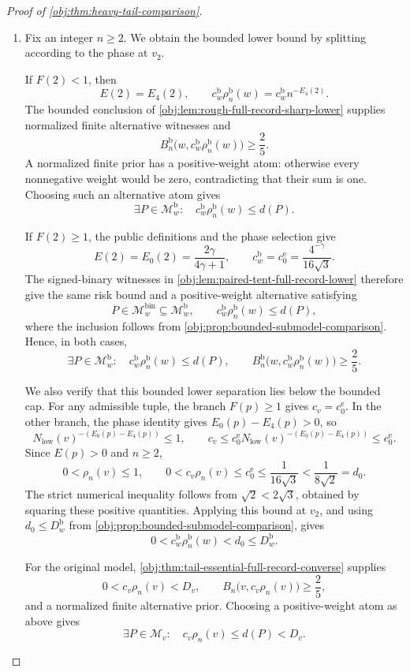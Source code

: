\begin{proof}[Proof of \cref{obj:thm:heavy-tail-comparison}]
\begin{enumerate}
\item Fix an integer \(n\ge2\). We obtain the bounded lower bound by splitting according to the phase at \(v_2\).

If \(F(2)<1\), then
\[
E(2)=E_4(2),
\qquad
c_w^{\mathrm b}\rho_n^{\mathrm b}(w)
=c_w^{\mathrm b}n^{-E_4(2)}.
\]
The bounded conclusion of \cref{obj:lem:rough-full-record-sharp-lower} supplies normalized finite alternative witnesses and
\[
B_n^{\mathrm b}
 \bigl(w,c_w^{\mathrm b}\rho_n^{\mathrm b}(w)\bigr)
\ge\frac25.
\]
A normalized finite prior has a positive-weight atom: otherwise every nonnegative weight would be zero, contradicting that their sum is one. Choosing such an alternative atom gives
\[
\exists P\in\mathcal M_w^{\mathrm b}:
\quad
c_w^{\mathrm b}\rho_n^{\mathrm b}(w)\le d(P).
\]

If \(F(2)\ge1\), the public definitions and the phase selection give
\[
E(2)=E_0(2)=\frac{2\gamma}{4\gamma+1},
\qquad
c_w^{\mathrm b}=c_0^{\mathrm e}
=\frac{4^{-\gamma}}{16\sqrt3}.
\]
The signed-binary witnesses in \cref{obj:lem:paired-tent-full-record-lower} therefore give the same risk bound and a positive-weight alternative satisfying
\[
P\in\mathcal M_w^{\mathrm{bin}}
\subseteq\mathcal M_w^{\mathrm b},
\qquad
c_w^{\mathrm b}\rho_n^{\mathrm b}(w)\le d(P),
\]
where the inclusion follows from \cref{obj:prop:bounded-submodel-comparison}. Hence, in both cases,
\[
\exists P\in\mathcal M_w^{\mathrm b}:
\quad c_w^{\mathrm b}\rho_n^{\mathrm b}(w)\le d(P),
\qquad
B_n^{\mathrm b}
 \bigl(w,c_w^{\mathrm b}\rho_n^{\mathrm b}(w)\bigr)
\ge\frac25.
\]

We also verify that this bounded lower separation lies below the bounded cap. For any admissible tuple, the branch \(F(p)\ge1\) gives \(c_v=c_0^{\mathrm e}\). In the other branch, the phase identity gives \(E_0(p)-E_4(p)>0\), so
\[
N_{\mathrm{low}}(v)^{-(E_0(p)-E_4(p))}\le1,
\qquad
c_v\le
c_0^{\mathrm e}N_{\mathrm{low}}(v)^{-(E_0(p)-E_4(p))}
\le c_0^{\mathrm e}.
\]
Since \(E(p)>0\) and \(n\ge2\),
\[
0<\rho_n(v)\le1,
\qquad
0<c_v\rho_n(v)\le c_0^{\mathrm e}
\le\frac1{16\sqrt3}
<\frac1{8\sqrt2}=d_0.
\]
The strict numerical inequality follows from
\(\sqrt2<2\sqrt3\), obtained by squaring these positive quantities. Applying this bound at \(v_2\), and using
\(d_0\le D_w^{\mathrm b}\) from \cref{obj:prop:bounded-submodel-comparison}, gives
\[
0<c_w^{\mathrm b}\rho_n^{\mathrm b}(w)
<d_0\le D_w^{\mathrm b}.
\]

For the original model, \cref{obj:thm:tail-essential-full-record-converse} supplies
\[
0<c_v\rho_n(v)<D_v,
\qquad
B_n\bigl(v,c_v\rho_n(v)\bigr)\ge\frac25,
\]
and a normalized finite alternative prior. Choosing a positive-weight atom as above gives
\[
\exists P\in\mathcal M_v:
\quad c_v\rho_n(v)\le d(P)<D_v.
\]


\end{enumerate}
\end{proof}
